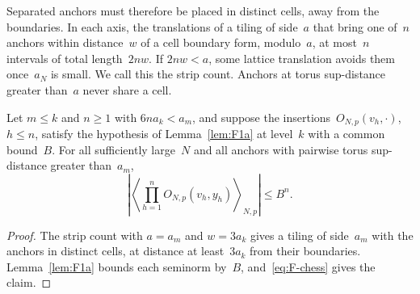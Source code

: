 Separated anchors must therefore be placed in distinct cells, away from the boundaries. In each axis, the translations of a tiling of side~$a$ that bring one of~$n$ anchors within distance~$w$ of a cell boundary form, modulo~$a$, at most~$n$ intervals of total length~$2nw$. If $2nw<a$, some lattice translation avoids them once~$a_N$ is small. We call this the strip count. Anchors at torus sup-distance greater than~$a$ never share a cell.
\begin{lemma}\label{lem:F-cells}
Let $m\le k$ and $n\ge1$ with $6na_k<a_m$, and suppose the insertions~$O_{N,p}(v_h,\cdot)$, $h\le n$, satisfy the hypothesis of Lemma~\ref{lem:F1a} at level~$k$ with a common bound~$B$. For all sufficiently large~$N$ and all anchors with pairwise torus sup-distance greater than~$a_m$,
\begin{equation*}
\left|\left\langle\prod_{h=1}^nO_{N,p}(v_h,y_h)\right\rangle_{N,p}\right|\le B^n.
\end{equation*}
\end{lemma}
\begin{proof}
The strip count with $a=a_m$ and $w=3a_k$ gives a tiling of side~$a_m$ with the anchors in distinct cells, at distance at least~$3a_k$ from their boundaries. Lemma~\ref{lem:F1a} bounds each seminorm by~$B$, and~\eqref{eq:F-chess} gives the claim.
\end{proof}

